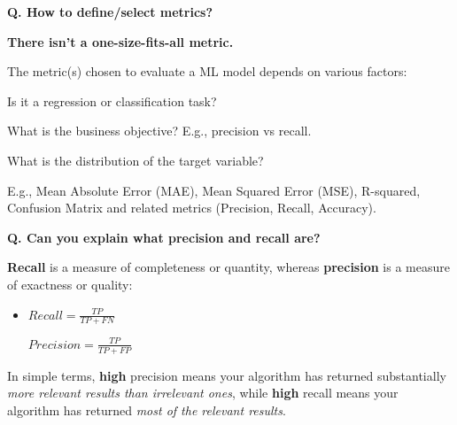 \begin{frame}[fragile]{\textbf{Q. How to define/select metrics?}}
\begin{wideitemize}
  \item {\large \textbf{There isn't a one-size-fits-all metric.}}
  \item The metric(s) chosen to evaluate a ML model depends on various factors:
  \begin{wideitemize}
    \item Is it a regression or classification task?
    \item What is the business objective? E.g., precision vs recall.
    \item What is the distribution of the target variable?
  \end{wideitemize}
  \item E.g., Mean Absolute Error (MAE), Mean Squared Error (MSE), R-squared,
  Confusion Matrix and related metrics (Precision, Recall, Accuracy).
\end{wideitemize}
\end{frame}



\begin{frame}[fragile]{\textbf{Q. Can you explain what precision and recall are?}}
\begin{wideitemize}
  \item \textbf{Recall} is a measure of completeness or quantity, whereas
  \textbf{precision} is a measure of exactness or quality:\vspace{.2em}
  \begin{itemize}
    \item \parbox[t]{1.5in}{$Recall = \frac{TP}{TP + FN}$} \hspace{.3in}
      \parbox[t]{1.5in}{$Precision = \frac{TP}{TP + FP}$}
  \end{itemize}
  \item In simple terms, \textbf{high} precision means your algorithm has returned
  substantially \textit{more relevant results than irrelevant ones}, while
  \textbf{high} recall means your algorithm has returned \textit{most of the
  relevant results}.
\end{wideitemize}
\end{frame}

